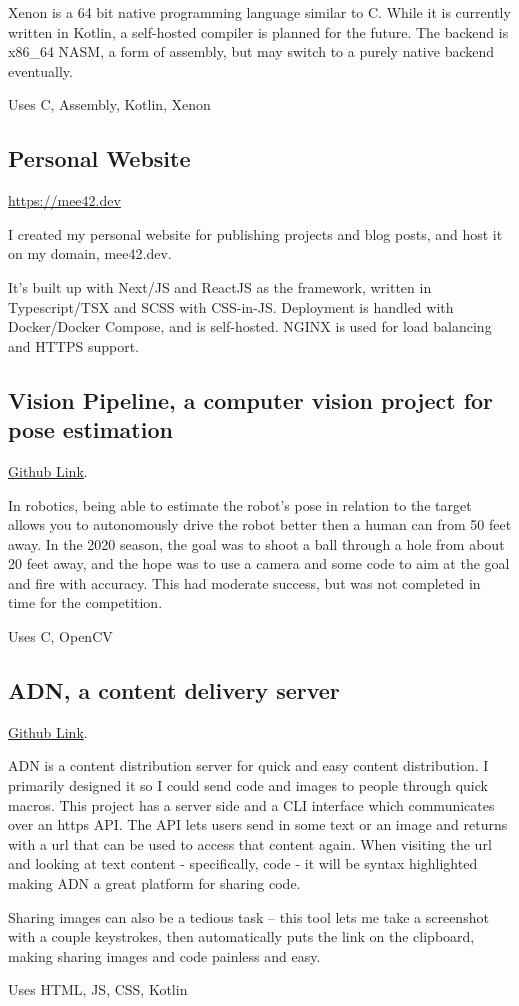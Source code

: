 \documentclass[10pt,letterpaper]{article}
\def\link#1#2{\color{blue!60!black}\href{#1}{#2}\color{black}}
\newcommand{\CPP}
{C\nolinebreak[4]\hspace{-.05em}\raisebox{.35ex}{\footnotesize\bf ++}}
\begin{document}
    Xenon is a 64 bit native programming language similar to C.
    While it is currently written in Kotlin, a self-hosted compiler is planned for the future.
    The backend is x86\_64 NASM, a form of assembly,
    but may switch to a purely native backend eventually.
    
    \vspace{0.5em}
    \noindent Uses C, Assembly, Kotlin, Xenon

    \subsection*{Personal Website}
    \link{https://mee42.dev}{https://mee42.dev}

    I created my personal website for publishing projects and blog posts, and host it on my domain, mee42.dev.
    
    \vspace{0.5em}
    \noindent It's built up with Next/JS and ReactJS as the framework, written in Typescript/TSX and SCSS with CSS-in-JS.
    Deployment is handled with Docker/Docker Compose, and is self-hosted. NGINX is used for load balancing and HTTPS support.  
    

    \subsection*{Vision Pipeline, a computer vision project for pose estimation}
    \link{https://github.com/CougarProgramming623/vision-pipeline}{Github Link}.
    
    In robotics, being able to estimate the robot's pose in relation to the target
    allows you to autonomously drive the robot better then a human can from 50 feet away.
    In the 2020 season, the goal was to shoot a ball through a hole from about 20 feet away,
    and the hope was to use a camera and some code to aim at the goal and fire with accuracy.
    This had moderate success, but was not completed in time for the competition.

    \vspace{0.5em}
    \noindent Uses \CPP, OpenCV

    \subsection*{ADN, a content delivery server}
    
    \link{https://github.com/mee42/adn}{Github Link}.
    
    ADN is a content distribution server for quick and easy content distribution.
    I primarily designed it so I could send code and images to people through quick macros.
    This project has a server side and a CLI interface which communicates over an https API.
    The API lets users send in some text or an image
    and returns with a url that can be used to access that content again.
    When visiting the url and looking at text content - specifically, code - it will be syntax highlighted
    making ADN a great platform for sharing code.

    Sharing images can also be a tedious task -- 
    this tool lets me take a screenshot with a couple keystrokes,
    then automatically puts the link on the clipboard,
    making sharing images and code painless and easy.

    \vspace{0.5em}
    \noindent Uses HTML, JS, CSS, Kotlin
\end{document}
